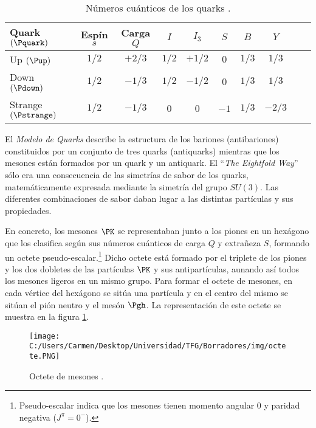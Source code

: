 \begin{table}[h!]
	\centering
	\begin{tabular}{l*{8}{c}r}
\hline
Quark $(\Pquark)$ & Espín $s$ & Carga $Q$ & $I$ & $I_3$ & $S$ & $B$ & $Y$\\ 
\hline
Up $(\Pup)$ & $1/2$ & $+2/3$ & $1/2$ & $+1/2$ & $0$ & $1/3$ & $1/3$\\
Down $(\Pdown)$ & $1/2$ & $-1/3$ & $1/2$ & $-1/2$ & $0$ & $1/3$ & $1/3$\\
Strange $(\Pstrange)$ & $1/2$ & $-1/3$ & $0$ & $0$ & $-1$ & $1/3$ & $-2/3$\\
\hline
	\end{tabular}
\caption[Números cuánticos de los quarks]{Números cuánticos de los quarks \cite{notas2020}.} %
\label{tab:propiedades_quarks}
\end{table}


El \textit{Modelo de Quarks} describe la estructura de los bariones (antibariones) constituidos por un conjunto de tres quarks (antiquarks) mientras que los mesones están formados por un quark y un antiquark. El ``\textit{The Eightfold Way}'' sólo era una consecuencia de las simetrías de sabor de los quarks, matemáticamente expresada mediante la simetría del grupo $SU(3)$. Las diferentes combinaciones de sabor daban lugar a las distintas partículas y sus propiedades.

En concreto, los mesones $\PK$ se representaban junto a los piones en un hexágono que los clasifica según sus números cuánticos de carga $Q$ y extrañeza $S$, formando un octete pseudo-escalar.\footnote{Pseudo-escalar indica que los mesones tienen momento angular 0 y paridad negativa ($J^\pi = 0^-$).} Dicho octete está formado por el triplete de los piones y los dos dobletes de las partículas $\PK$ y sus antipartículas, aunando así todos los mesones ligeros en un mismo grupo. Para formar el octete de mesones, en cada vértice del hexágono se sitúa una partícula y en el centro del mismo se sitúan el pión neutro y el mesón $\Pgh$. La representación de este octete se muestra en la figura \ref{fig:octete}.

\begin{figure}[h!]
	\centering
	\texttt{[image: C:/Users/Carmen/Desktop/Universidad/TFG/Borradores/img/octete.PNG]}
	\caption[Octete de mesones]
	{Octete de mesones \cite{Griffiths2008}.}
	\label{fig:octete}
\end{figure}

